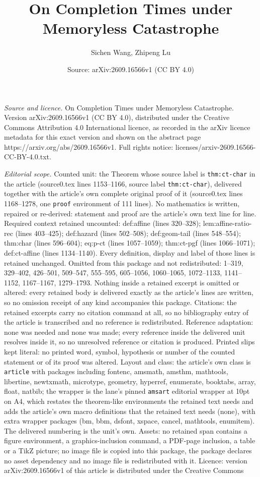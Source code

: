 \documentclass[10pt,a4paper]{amsart}
\title[On Completion Times under Memoryless Catastrophe]{On Completion Times under Memoryless Catastrophe}
\author{Sichen Wang, Zhipeng Lu}
\date{Source: arXiv:2609.16566v1 (CC BY 4.0)}
\begin{document}
\maketitle

\noindent\emph{Source and licence.} On Completion Times under Memoryless Catastrophe. Version arXiv:2609.16566v1 (CC BY 4.0), distributed under the Creative Commons Attribution 4.0 International licence, as recorded in the arXiv licence metadata for this exact version and shown on the abstract page https://arxiv.org/abs/2609.16566v1. Full rights notice: licenses/arxiv-2609.16566-CC-BY-4.0.txt.\par\smallskip

\noindent\textit{Editorial scope.} Counted unit: the Theorem whose source label is \texttt{thm:ct-char} in the article (source0.tex lines 1153--1166, source label \texttt{thm:ct-char}), delivered together with the article's own complete original proof of it (source0.tex lines 1168--1278, one \texttt{proof} environment of 111 lines). No mathematics is written, repaired or re-derived: statement and proof are the article's own text line for line. Required context retained uncounted: def:affine (lines 320--328); lem:affine-ratio-rec (lines 403--425); def:hazard (lines 502--508); def:geom-tail (lines 548--554); thm:char (lines 596--604); eq:p-ct (lines 1057--1059); thm:ct-pgf (lines 1066--1071); def:ct-affine (lines 1134--1140). Every definition, display and label of those lines is retained unchanged. Omitted from this package and not redistributed: 1--319, 329--402, 426--501, 509--547, 555--595, 605--1056, 1060--1065, 1072--1133, 1141--1152, 1167--1167, 1279--1793. Nothing inside a retained excerpt is omitted or altered: every retained body is delivered exactly as the article's lines are written, so no omission receipt of any kind accompanies this package. Citations: the retained excerpts carry no citation command at all, so no bibliography entry of the article is transcribed and no reference is redistributed. Reference adaptation: none was needed and none was made; every reference inside the delivered unit resolves inside it, so no unresolved reference or citation is produced. Printed slips kept literal: no printed word, symbol, hypothesis or number of the counted statement or of its proof was altered. Layout and class: the article's own class is \texttt{article} with packages including fontenc, amsmath, amsthm, mathtools, libertine, newtxmath, microtype, geometry, hyperref, enumerate, booktabs, array, float, natbib; the wrapper is the lane's pinned \texttt{amsart} editorial wrapper at 10pt on A4, which restates the theorem-like environments the retained text needs and adds the article's own macro definitions that the retained text needs (none), with extra wrapper packages (bm, bbm, dsfont, xspace, cancel, mathtools, enumitem). The delivered numbering is the unit's own. Assets: no retained span contains a figure environment, a graphics-inclusion command, a PDF-page inclusion, a table or a TikZ picture; no image file is copied into this package, the package declares no asset dependency and no image file is redistributed with it. Licence: version arXiv:2609.16566v1 of this article is distributed under the Creative Commons 
\end{document}
